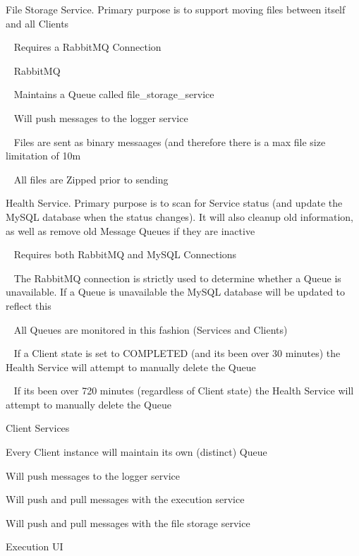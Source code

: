 \begin{DoxyItemize}
\item File Storage Service. Primary purpose is to support moving files between itself and all Clients
\item ~ Requires a Rabbit\+MQ Connection
\item ~ Rabbit\+MQ
\item ~ Maintains a Queue called file\+\_\+storage\+\_\+service
\item ~ Will push messages to the logger service
\item ~ Files are sent as binary messaages (and therefore there is a max file size limitation of 10m
\item ~ All files are Zipped prior to sending
\item Health Service. Primary purpose is to scan for Service status (and update the My\+SQL database when the status changes). It will also cleanup old information, as well as remove old Message Queues if they are inactive
\item ~ Requires both Rabbit\+MQ and My\+SQL Connections
\item ~ The Rabbit\+MQ connection is strictly used to determine whether a Queue is unavailable. If a Queue is unavailable the My\+SQL database will be updated to reflect this
\item ~ All Queues are monitored in this fashion (Services and Clients)
\item ~ If a Client state is set to COMPLETED (and it\textquotesingle{}s been over 30 minutes) the Health Service will attempt to manually delete the Queue
\item ~ If it\textquotesingle{}s been over 720 minutes (regardless of Client state) the Health Service will attempt to manually delete the Queue ~\newline

\end{DoxyItemize}

Client Services


\begin{DoxyItemize}
\item Every Client instance will maintain it\textquotesingle{}s own (distinct) Queue
\item Will push messages to the logger service
\item Will push and pull messages with the execution service
\item Will push and pull messages with the file storage service
\end{DoxyItemize}

Execution UI


